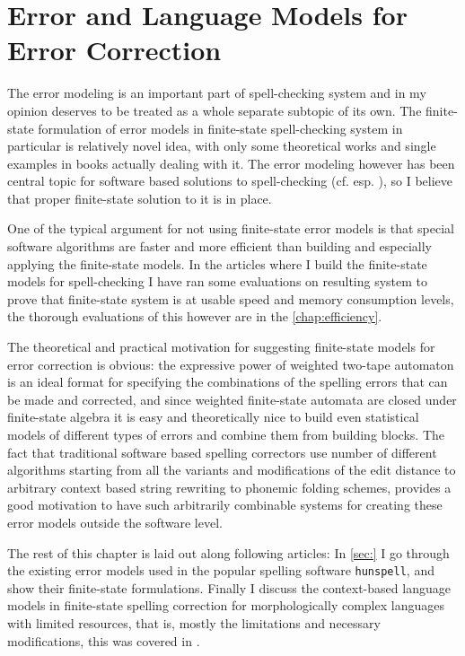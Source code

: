 \documentclass[officiallayout,draft]{unihelcompling}
\begin{document}
\chapter{Error and Language Models for Error Correction}
\label{chap:error-models}

The error modeling is an important part of spell-checking system and in my
opinion deserves to be treated as a whole separate subtopic of its own. The
finite-state formulation of error models in finite-state spell-checking system
in particular is relatively novel idea, with only some theoretical 
works \cite{agata,mohri} and single examples in books\cite{beesley2003finite}
actually dealing with it. The error modeling however has been central topic
for software based solutions to spell-checking (cf. esp. \cite{}), so I believe
that proper finite-state solution to it is in place.

One of the typical argument for not using finite-state error models is that
special software algorithms are faster and more efficient than building and
especially applying the finite-state models. In the articles where I build
the finite-state models for spell-checking I have ran some evaluations on
resulting system to prove that finite-state system is at usable speed
and memory consumption levels, the thorough evaluations of this however
are in the \ref{chap:efficiency}.

The theoretical and practical motivation for suggesting finite-state models for
error correction is obvious: the expressive power of weighted two-tape 
automaton is an ideal format for specifying the combinations of the
spelling errors that can be made and corrected, and since weighted
finite-state automata are closed under finite-state algebra it is easy
and theoretically nice to build even statistical models of different types
of errors and combine them from building blocks. The fact that traditional
software based spelling correctors use number of different algorithms starting
from all the variants and modifications of the edit distance to arbitrary
context based string rewriting to phonemic folding schemes, provides a good
motivation to have such arbitrarily combinable systems for creating these
error models outside the software level.

The rest of this chapter is laid out along following articles: In
\ref{sec:} I go through the existing error models used in the popular spelling
software \texttt{hunspell}, and show their finite-state formulations.
 Finally I discuss the context-based language models
in finite-state spelling correction for morphologically complex languages with
limited resources, that is, mostly the limitations and necessary modifications,
this was covered in \cite{pirinen2012cicling}. 
\end{document}
